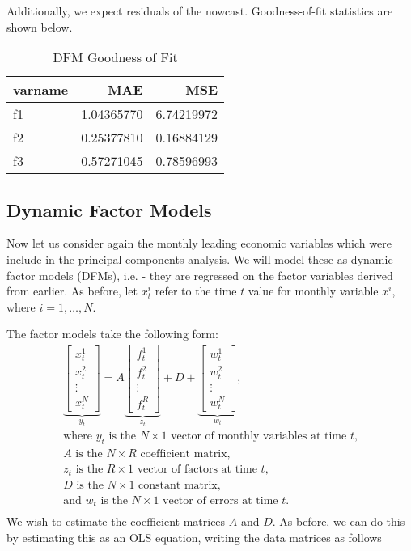\documentclass[11pt, letterpaper]{article}\usepackage[]{graphicx}\usepackage[]{color}
\begin{document}
Additionally, we expect residuals of the nowcast. Goodness-of-fit statistics are shown below.
\begin{table}[H]
\centering
\begingroup\footnotesize
\begin{tabular}{lrr}
  \hline
varname & MAE & MSE \\ 
  \hline
f1 & 1.04365770 & 6.74219972 \\ 
  f2 & 0.25377810 & 0.16884129 \\ 
  f3 & 0.57271045 & 0.78596993 \\ 
   \hline
\end{tabular}
\endgroup
\caption{DFM Goodness of Fit} 
\end{table}




\subsection{Dynamic Factor Models}
Now let us consider again the monthly leading economic variables which were include in the principal components analysis. We will model these as dynamic factor models (DFMs), i.e. - they are regressed on the factor variables derived from earlier. As before, let $x^i_t$ refer to the time $t$ value for monthly variable $x^i$, where $i = 1, \dots, N$.

The factor models take the following form:
\begin{align*}
\underbrace{\begin{bmatrix}
	x^1_t\\
	x^2_t\\
	\vdots \\
	x^N_t
\end{bmatrix}}_{y_t}
=
A
\underbrace{\begin{bmatrix}
	f^1_{t}\\
	f^2_{t}\\
	\vdots \\
	f^R_{t}
\end{bmatrix}}_{z_t}
+
D 
+
\underbrace{\begin{bmatrix}
	w^1_t\\
	w^2_t\\
	\vdots\\
	w^N_t
\end{bmatrix}}_{w_t},\\
\text{where $y_t$ is the $N \times 1$ vector of monthly variables at time $t$,}\\
\text{$A$ is the $N \times R$ coefficient matrix,}\\
\text{$z_t$ is the $R \times 1$ vector of factors at time $t$,}\\
\text{$D$ is the $N \times 1$ constant matrix,}\\
\text{and $w_t$ is the $N \times 1$ vector of errors at time $t$.}\\
\end{align*}
We wish to estimate the coefficient matrices $A$ and $D$. As before, we can do this by estimating this as an OLS equation, writing the data matrices as follows
\end{document}
